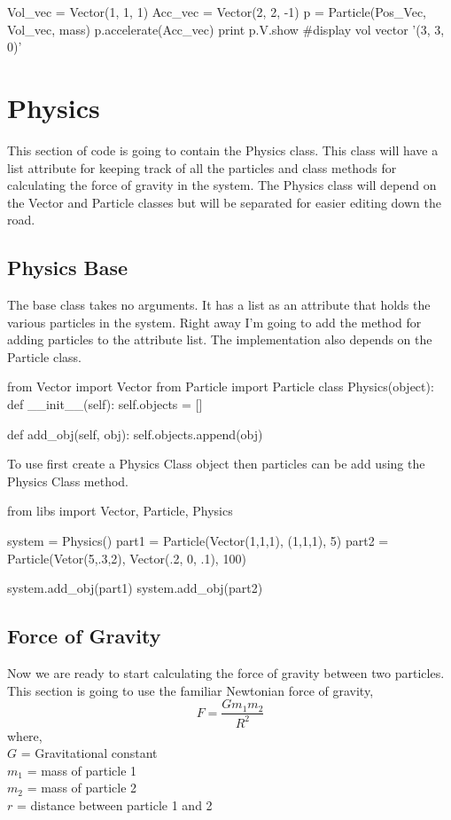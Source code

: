 \documentclass[15pt]{report}
\begin{document}
\begin{code}
Vol_vec = Vector(1, 1, 1)
Acc_vec = Vector(2, 2, -1)
p = Particle(Pos_Vec, Vol_vec, mass)
p.accelerate(Acc_vec)
print p.V.show		#display vol vector
'(3, 3, 0)'
\end{code}

\section{Physics}
This section of code is going to contain the Physics class. This class will have a list attribute for keeping track of all the particles and class methods for calculating the force of gravity in the system. The Physics class will depend on the Vector and Particle classes but will be separated for easier editing down the road.
\subsection{Physics Base} The base class takes no arguments. It has a list as an attribute that holds the various particles in the system. Right away I'm going to add the method for adding particles to the attribute list. The implementation also depends on the Particle class.

\begin{code}
from Vector import Vector
from Particle import Particle
class Physics(object):
    def __init__(self):
        self.objects = []
        
    def add_obj(self, obj):
        self.objects.append(obj)
\end{code}
 
To use first create a Physics Class object then particles can be add using the Physics Class method. 

\begin{code}
from libs import Vector, Particle, Physics

system = Physics()
part1 = Particle(Vector(1,1,1), (1,1,1), 5)
part2 = Particle(Vetor(5,.3,2), Vector(.2, 0, .1), 100)

system.add_obj(part1)
system.add_obj(part2)

\end{code}

\subsection{Force of Gravity}
Now we are ready to start calculating the force of gravity between two particles. This section is going to use the familiar Newtonian force of gravity,
\begin{equation} \label{grav}
F = \frac{G m_1 m_2}{R^2} 
\end{equation}
where, \\
$G$ = Gravitational constant \\
$m_1$ = mass of particle 1 \\
$m_2$ = mass of particle 2 \\
$r$ = distance between particle 1 and 2
\end{document}
